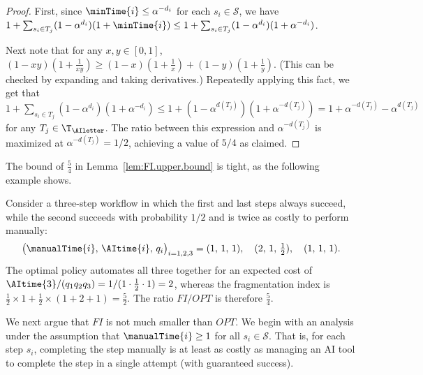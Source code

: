 \begin{proof}
First, since $\minTime{i} \leq \alpha^{-d_i}$ for each $s_i \in \mathcal{S}$, we have $1 + \sum_{s_i \in T_j}(1-\alpha^{d_i})(1+\minTime{i}) \leq 1 + \sum_{s_i \in T_j}(1-\alpha^{d_i})(1+\alpha^{-d_i})$.

Next note that for any $x,y\in [0,1]$, $(1-xy)(1+\tfrac{1}{xy}) \geq (1-x)(1+\tfrac{1}{x}) + (1-y)(1+\tfrac{1}{y})$.
(This can be checked by expanding and taking derivatives.)
Repeatedly applying this fact, we get that $1 + \sum_{s_i \in T_j}(1-\alpha^{d_i})(1+\alpha^{-d_i}) \leq 1 + (1-\alpha^{d(T_j)})(1+\alpha^{-d(T_j)}) = 1 + \alpha^{-d(T_j)} - \alpha^{d(T_j)}$ for any $T_j \in \T_{\AIletter}$.
The ratio between this expression and $\alpha^{-d(T_j)}$ is maximized at $\alpha^{-d(T_j)} = 1/2$, achieving a value of $5/4$ as claimed.
\end{proof}

The bound of $\tfrac{5}{4}$ in Lemma~\ref{lem:FI.upper.bound} is tight, as the following example shows.

\begin{example}
\label{ex:FI.tight}
Consider a three-step workflow in which the first and last steps always succeed, while the second succeeds with probability $1/2$ and is twice as costly to perform manually:
\[ \bigl(\manualTime{i},\, \AItime{i},\, q_i\bigr)_{i=1,2,3} = (1,\,1,\,1),\quad (2,\,1,\,\tfrac12),\quad (1,\,1,\,1). \]
The optimal policy automates all three together for an expected cost of $\AItime{3}/(q_1 q_2 q_3) = 1/(1 \cdot \tfrac12 \cdot 1) = 2$, whereas the fragmentation index is $\tfrac12 \times 1 + \tfrac12 \times (1+2+1) = \tfrac52$.
The ratio $FI/OPT$ is therefore $\tfrac54$.
\end{example}

We next argue that $FI$ is not much smaller than $OPT$.
We begin with an analysis under the assumption that $\manualTime{i} \geq 1$ for all $s_i \in \mathcal{S}$.
That is, for each step $s_i$, completing the step manually is at least as costly as managing an AI tool to complete the step in a single attempt (with guaranteed success).

